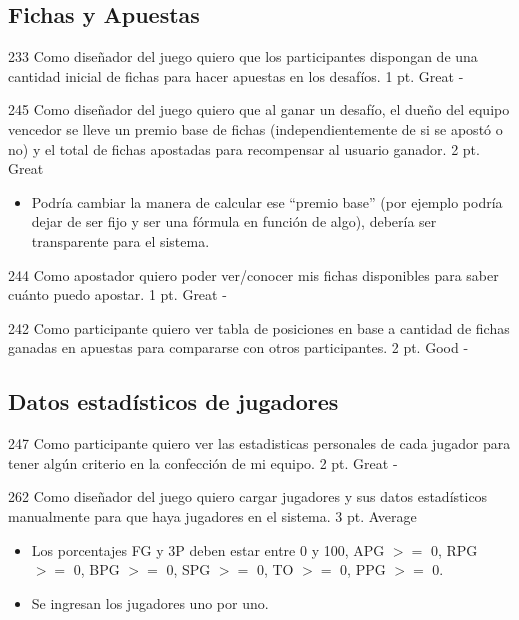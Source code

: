 \vspace{1cm}


\subsection{Fichas y Apuestas}

\simplestory
{233}
{Como diseñador del juego quiero que los participantes dispongan de una cantidad inicial de fichas para hacer apuestas en los desafíos.}
{1 pt.}
{Great}
{-}

\vspace{1cm}

\simplestory
{245}
{Como diseñador del juego quiero que al ganar un desafío, el dueño del equipo vencedor se lleve un premio base de fichas (independientemente de si se apostó o no) y el total de fichas apostadas para recompensar al usuario ganador.
}
{2 pt.}
{Great}
{\begin{itemize}
\item Podría cambiar la manera de calcular ese ``premio base'' (por ejemplo podría dejar de ser fijo y ser una fórmula en función de algo), debería ser transparente para el sistema.
\end{itemize}}

\vspace{1cm}

\simplestory
{244}
{Como apostador quiero poder ver/conocer mis fichas disponibles para saber cuánto puedo apostar.}
{1 pt.}
{Great}
{-}

\vspace{1cm}

\simplestory
{242}
{Como participante quiero ver tabla de posiciones en base a cantidad de fichas ganadas en apuestas para compararse con otros participantes.}
{2 pt.}
{Good}
{-}

\vspace{1cm}


\subsection{Datos estadísticos de jugadores}

\simplestory
{247}
{Como participante quiero ver las estadisticas personales de cada jugador para tener algún criterio en la confección de mi equipo.}
{2 pt.}
{Great}
{-}

\vspace{1cm}

\simplestory
{262}
{Como diseñador del juego quiero cargar jugadores y sus datos estadísticos manualmente para que haya jugadores en el sistema.}
{3 pt.}
{Average}
{\begin{itemize}
\item Los porcentajes FG y 3P deben estar entre 0 y 100, APG $>=$ 0, RPG $>=$ 0, BPG $>=$ 0, SPG $>=$ 0, TO $>=$ 0, PPG $>=$ 0.
\item Se ingresan los jugadores uno por uno.
\end{itemize}}

